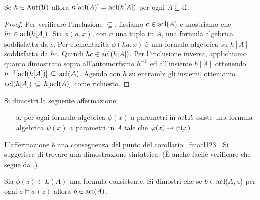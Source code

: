 \begin{lemma}\label{estensionemappechiusuraalgebrica}
Se $h\in\textrm{Aut}(\EuScript U)$ allora $h[\mathop{\rm acl}(A)]=\mathop{\rm acl}(h[A])$ per ogni $A\subseteq\EuScript U$. 
\end{lemma}

\begin{proof}
Per verificare l'inclusione $\subseteq$, fissiamo $c\in\mathop{\rm acl}(A)$ e mostriamo che $hc\in\mathop{\rm acl}(h[A])$. Sia $\phi(a,x)$, con $a$ una tupla in $A$, una formula algebrica soddisfatta da $c$.  Per elementarit\`a $\phi(ha,x)$ \`e una formula algebrica su $h[A]$ soddisfatta da $hc$. Quindi $hc\in\mathop{\rm acl}(h[A])$. Per l'inclusione inversa, applichiamo quanto dimostrato sopra all'automorfismo $h^{-1}$ ed all'insieme $h[A]$ ottenendo $h^{-1}[\mathop{\rm acl}(h[A])]\,\subseteq\,\mathop{\rm acl}(A)$. Agendo con $h$ su entrambi gli insiemi, otteniamo $\mathop{\rm acl}(h[A])\,\subseteq\,h[\mathop{\rm acl}(A)]$ come richiesto.
\end{proof}

\begin{exercise}
Si dimostri la seguente affermazione:
\begin{itemize}
\item[a.] per ogni formula algebrica $\phi(x)$ a parametri in $\mathop{\rm acl} A$ esiste una formula algebrica $\psi(x)$ a parametri in $A$ tale che $\varphi(x)\rightarrow\psi(x)$.
\end{itemize} 
L'affermazione  \`e una conseguenza del punto  del corollario~\ref{fmacl123}. Si suggerisce di trovare una dimostrazione sintattica. (\`E anche facile verificare che  segue da .)\QED
\end{exercise}

% 

\begin{exercise}\label{pofu}
Sia $\phi(z)\in L(A)$ una formula consistente. Si dimostri che se $b\in\mathop{\rm acl}(A,a)$ per ogni $a\models\phi(z)$ allora $b\in\mathop{\rm acl}(A)$.\QED
\end{exercise}

